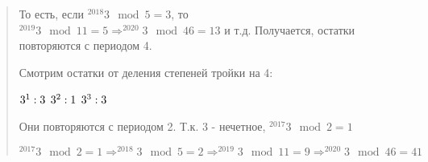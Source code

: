 \documentclass{article}
\begin{document}
\begin{quote}
То есть, если $^{2018} 3 \mod 5 = 3$, то $^{2019} 3 \mod 11 = 5 \Longrightarrow ^{2020} 3 \mod 46 = 13$ и т.д.
Получается, остатки повторяются с периодом 4.

Смотрим остатки от деления степеней тройки на 4:

\begin{center}
    $3^1: 3\\$
    $3^2: 1\\$
    $3^3: 3\\$
\end{center}

Они повторяются с периодом 2. Т.к. 3 - нечетное, $^{2017} 3 \mod 2 = 1$

$^{2017} 3 \mod 2 = 1 \Longrightarrow ^{2018} 3 \mod 5 = 2 \Longrightarrow ^{2019} 3 \mod 11 = 9 \Longrightarrow ^{2020} 3 \mod 46 = 41$


\end{quote}
\end{document}
